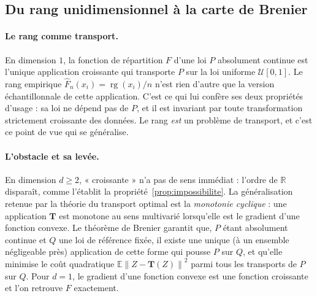 \documentclass[11pt,a4paper]{article}
\theoremstyle{definition}
\theoremstyle{remark}
\newcommand{\R}{\mathbb{R}}
\newcommand{\EE}{\mathbb{E}}
\newcommand{\Unif}{\mathcal{U}}
\newcommand{\norm}[1]{\left\lVert #1 \right\rVert}
\newcommand{\Tmap}{\mathbf{T}}
\newcommand{\rg}{\operatorname{rg}}
\begin{document}
\bigskip

\subsection{Du rang unidimensionnel à la carte de Brenier}
\label{sec:ot-idee}

\medskip

\paragraph{Le rang comme transport.} En dimension $1$, la fonction de répartition $F$ d'une
loi $P$ absolument continue est l'unique application croissante qui transporte $P$ sur la
loi uniforme $\Unif[0,1]$. Le rang empirique $\hat F_n(x_i) = \rg(x_i)/n$ n'est rien
d'autre que la version échantillonnale de cette application. C'est ce qui lui confère ses
deux propriétés d'usage : sa loi ne dépend pas de $P$, et il est invariant par toute
transformation strictement croissante des données. Le rang \emph{est} un problème de
transport, et c'est ce point de vue qui se généralise.

\medskip

\paragraph{L'obstacle et sa levée.} En dimension $d \ge 2$, « croissante » n'a pas de sens
immédiat : l'ordre de $\R$ disparaît, comme l'établit la propriété~\ref{prop:impossibilite}.
La généralisation retenue par la théorie du transport optimal est la
\emph{monotonie cyclique} : une application $\Tmap$ est monotone au sens multivarié
lorsqu'elle est le gradient d'une fonction convexe. Le théorème de Brenier garantit que,
$P$ étant absolument continue et $Q$ une loi de référence fixée, il existe une unique (à un
ensemble négligeable près) application de cette forme qui pousse $P$ sur $Q$, et qu'elle
minimise le coût quadratique $\EE\norm{Z - \Tmap(Z)}^2$ parmi tous les transports de $P$
sur $Q$. Pour $d = 1$, le gradient d'une fonction convexe est une fonction croissante et
l'on retrouve $F$ exactement.

\medskip
\end{document}
